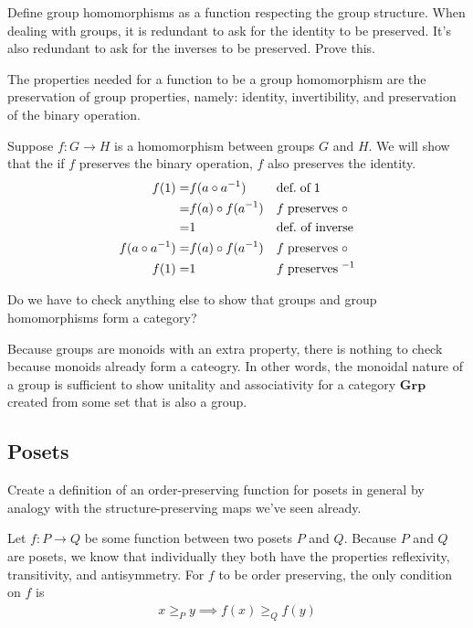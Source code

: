 \begin{ttta}
	Define group homomorphisms as a function respecting the group structure. When
	dealing with groups, it is redundant to ask for the identity to be preserved.
	It’s also redundant to ask for the inverses to be preserved. Prove this.
\end{ttta}
\begin{proofitem}
	\item The properties needed for a function to be a group homomorphism are the
	preservation of group properties, namely: identity, invertibility, and
	preservation of the binary operation.
	\item Suppose $f: G \rightarrow H$ is a homomorphism between groups $G$ and $H$.
	We will show that the if $f$ preserves the binary operation, $f$ also
	preserves the identity.
	\begin{align*}
		f(1) =             & f(a\circ a^{-1})    &  & \text{def.\;of\;}1         \\
		=                  & f(a)\circ f(a^{-1}) &  & f\;\text{preserves}\;\circ \\
		=                  & 1                   &  & \text{def.\ of inverse}    \\
		f(a\circ a^{-1}) = & f(a)\circ f(a^{-1}) &  & f\;\text{preserves}\;\circ \\
		f(1) =             & 1                   &  & f\;\text{preserves}\;^{-1} \\
	\end{align*}
\end{proofitem}

\begin{ttta}
	Do we have to check anything else to show that groups and group homomorphisms form a category?
\end{ttta}
Because groups are monoids with an extra property, there is nothing to check
because monoids already form a cateogry. In other words, the monoidal nature of
a group is sufficient to show unitality and associativity for a category
$\mathbf{Grp}$ created from some set that is also a group.

\subsection{Posets}
\begin{ttta}
	Create a definition of an order-preserving function for posets in general by
	analogy with the structure-preserving maps we've seen already.
\end{ttta}
\begin{proofitem}
	\item Let $f:P\rightarrow Q$ be some function between two posets $P$ and $Q$.
	Because $P$ and $Q$ are posets, we know that individually they both have the
	properties reflexivity, transitivity, and antisymmetry. For $f$ to be order
	preserving, the only condition on $f$ is
	\begin{align*}
		x\geq_P y \implies f(x)\geq_Q f(y)
	\end{align*}
\end{proofitem}

